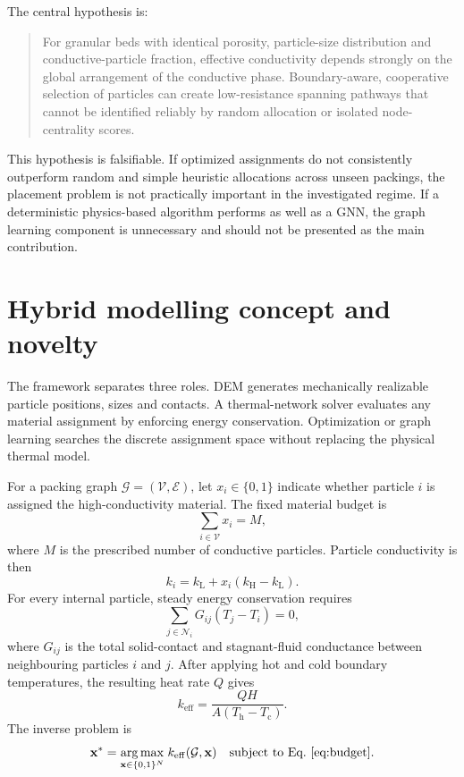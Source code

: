 \documentclass[12pt,a4paper]{article}
\begin{document}
The central hypothesis is:
\begin{quote}
For granular beds with identical porosity, particle-size distribution and
conductive-particle fraction, effective conductivity depends strongly on the
global arrangement of the conductive phase. Boundary-aware, cooperative
selection of particles can create low-resistance spanning pathways that cannot
be identified reliably by random allocation or isolated node-centrality scores.
\end{quote}

This hypothesis is falsifiable. If optimized assignments do not consistently
outperform random and simple heuristic allocations across unseen packings, the
placement problem is not practically important in the investigated regime. If
a deterministic physics-based algorithm performs as well as a GNN, the graph
learning component is unnecessary and should not be presented as the main
contribution.

\section{Hybrid modelling concept and novelty}

The framework separates three roles. DEM generates mechanically realizable
particle positions, sizes and contacts. A thermal-network solver evaluates any
material assignment by enforcing energy conservation. Optimization or graph
learning searches the discrete assignment space without replacing the physical
thermal model.

For a packing graph $\mathcal G=(\mathcal V,\mathcal E)$, let
$x_i\in\{0,1\}$ indicate whether particle $i$ is assigned the high-conductivity
material. The fixed material budget is
\begin{equation}
    \sum_{i\in\mathcal V}x_i=M,
    \label{eq:budget}
\end{equation}
where $M$ is the prescribed number of conductive particles. Particle
conductivity is then
\begin{equation}
    k_i=k_{\mathrm L}+
    x_i\left(k_{\mathrm H}-k_{\mathrm L}\right).
\end{equation}
For every internal particle, steady energy conservation requires
\begin{equation}
    \sum_{j\in\mathcal N_i}G_{ij}(T_j-T_i)=0,
    \label{eq:energy_balance}
\end{equation}
where $G_{ij}$ is the total solid-contact and stagnant-fluid conductance between
neighbouring particles $i$ and $j$. After applying hot and cold
boundary temperatures, the resulting heat rate $Q$ gives
\begin{equation}
    k_{\mathrm{eff}}=\frac{QH}{A\left(T_{\mathrm h}-T_{\mathrm c}\right)}.
    \label{eq:keff}
\end{equation}
The inverse problem is
\begin{equation}
    \mathbf x^{*}=\underset{\mathbf x\in\{0,1\}^{N}}
    {\operatorname{arg\,max}}\;
    k_{\mathrm{eff}}(\mathcal G,\mathbf x)
    \quad\text{subject to Eq.~\eqref{eq:budget}.}
    \label{eq:inverse}
\end{equation}
\end{document}
